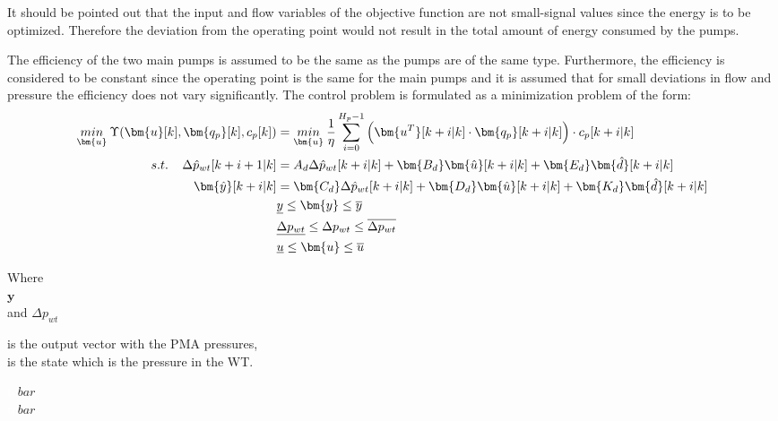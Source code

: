 It should be pointed out that the input and flow variables of the objective function are not small-signal values since the energy is to be optimized. Therefore the deviation from the operating point would not result in the total amount of energy consumed by the pumps. 

The efficiency of the two main pumps is assumed to be the same as the pumps are of the same type. Furthermore, the efficiency is considered to be constant since the operating point is the same for the main pumps and it is assumed that for small deviations in flow and pressure the efficiency does not vary significantly. 
The control problem is formulated as a minimization problem of the form:
\begin{align}
\underset{\bm{u}}{min} \:  \Upsilon(\bm{u}[k],\bm{q_p}[k],c_p[k]) &= \underset{\bm{u}}{min} \: \frac{1}{\eta} \sum_{i=0}^{H_p-1} \Big( \bm{u^T}[k+i|k] \cdot \bm{q_{p}}[k+i|k]\Big)\cdot c_p[k+i|k] \label{eqcost1} \\
%
\newline
s.t. \:\:\:\:\:  \Delta \hat{p}_{wt} [k+i+1|k] &= A_d \Delta \hat{p}_{wt}[k+i|k]  + \bm{B_d} \bm{\hat{u}}[k+i|k] + \bm{E_d} \bm{\hat{d}}[k+i|k] \label{dyn}  \\ 
%
\bm{\hat{y}}[k+i|k] &= \bm{C_d} \Delta \hat{p}_{wt}[k+i|k] + \bm{D_d} \bm{\hat{u}}[k+i|k] + \bm{K_d} \bm{\hat{d}}[k+i|k] \\
%
& \underline{y} \leq \bm{y} \leq \overline{y} \\
%
& \underline{\Delta p_{wt}} \leq \Delta p_{wt} \leq \overline{\Delta p_{wt}} \\
%
& \underline{u} \leq \bm{u} \leq \overline{u} \label{eqconst2} 
\end{align}

 \begin{minipage}[t]{0.24\textwidth}
 Where\\
 \hspace*{8mm} $\bm{y}$ \\
and \hspace*{0.7mm} $\Delta p_{wt}$ 
 \end{minipage}
 \begin{minipage}[t]{0.63\textwidth}
 \vspace*{2mm}
 is the output vector with the PMA pressures,\\
 is the state which is the pressure in the WT.
 \end{minipage}
 \begin{minipage}[t]{0.10\textwidth}
 \vspace*{2mm}
 \textcolor{White}{te}$\unit{bar}$\\
 \textcolor{White}{te}$\unit{bar}$
 \end{minipage}

